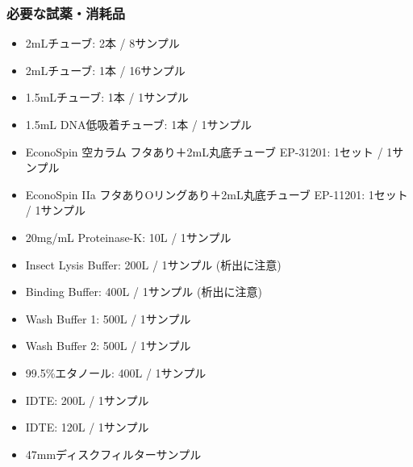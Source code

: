 \documentclass[titlepage,10pt,a4paper,uplatex]{jsbook}
\begin{document}
\subsubsection{必要な試薬・消耗品}
\begin{itemize}
\item 2mLチューブ: 2本 / 8サンプル
\item 2mLチューブ: 1本 / 16サンプル
\item 1.5mLチューブ: 1本 / 1サンプル
\item 1.5mL DNA低吸着チューブ: 1本 / 1サンプル
\item EconoSpin 空カラム フタあり＋2mL丸底チューブ EP-31201: 1セット / 1サンプル
\item EconoSpin IIa フタありOリングあり＋2mL丸底チューブ EP-11201: 1セット / 1サンプル
\item 20mg/mL Proteinase-K: 10{\textmu}L / 1サンプル
\item Insect Lysis Buffer: 200{\textmu}L / 1サンプル (析出に注意)
\item Binding Buffer: 400{\textmu}L / 1サンプル (析出に注意)
\item Wash Buffer 1: 500{\textmu}L / 1サンプル
\item Wash Buffer 2: 500{\textmu}L / 1サンプル
\item 99.5\%エタノール: 400{\textmu}L / 1サンプル
\item IDTE: 200{\textmu}L / 1サンプル
\item IDTE: 120{\textmu}L / 1サンプル
\item 47mmディスクフィルターサンプル
\end{itemize}
\end{document}
